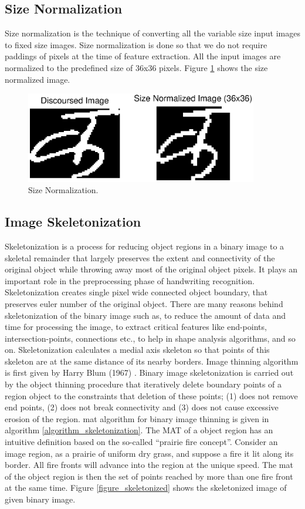 \subsection{Size Normalization}\label{section_size_normalization}
Size normalization is the technique of converting all the variable size input images to fixed size images. Size normalization is done so that we do not require paddings of pixels at the time of feature extraction. All the input images are normalized to the predefined size of $36$x$36$ pixels. Figure \ref{figure_size_normalized} shows the size normalized image.
\begin{figure}[h]
\centering
\includegraphics[width=4in]{figures/ka_preprocessing/size_normalized.eps}
\caption{Size Normalization.}
\label{figure_size_normalized}
\end{figure}

\subsection{Image Skeletonization}\label{section_skeletonization}
Skeletonization is a process for reducing object regions in a binary image to a skeletal remainder that largely preserves the extent and connectivity of the original object while throwing away most of the original object pixels. It plays an important role in the preprocessing phase of handwriting recognition. Skeletonization creates single pixel wide connected object boundary, that preserves euler number of the original object. There are many reasons behind skeletonization of the binary image such as, to reduce the amount of data and time for processing the image, to extract critical features like end-points, intersection-points, connections etc., to help in shape analysis algorithms, and so on. Skeletonization calculates a medial axis skeleton so that points of this skeleton are at the same distance of its nearby borders. Image thinning algorithm is first given by Harry Blum (1967) \cite{Blum1967}. Binary image skeletonization is carried out by the object thinning procedure that iteratively delete boundary points of a region object to the constraints that deletion of these points; (1) does not remove end points, (2) does not break connectivity and (3) does not cause excessive erosion of the region. \ac{mat} algorithm \cite{Gonzalez2008} for  binary image thinning  is given in algorithm \ref{algorithm_skeletonization}. The MAT of a object region has an intuitive definition based on the so-called ``prairie fire concept''. Consider an image region, as a prairie of uniform dry grass, and suppose a fire it lit along its border. All fire fronts will advance into the region at the unique speed. The \ac{mat} of the object region is then the set of points reached by more than one fire front at the same time. Figure \ref{figure_skeletonized} shows the skeletonized image of given binary image.

